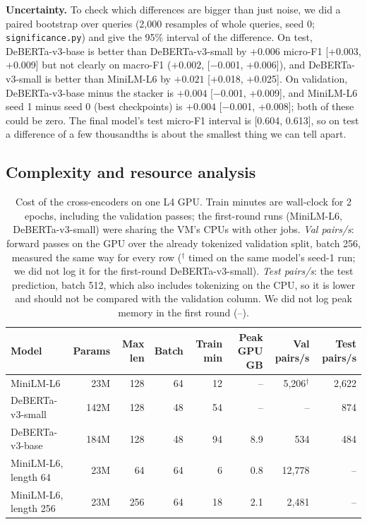 \documentclass[11pt]{article}
\begin{document}
\textbf{Uncertainty.} To check which differences are bigger than just noise, we did a paired bootstrap over queries (2{,}000 resamples of whole queries, seed 0; \texttt{significance.py}) and give the 95\% interval of the difference. On test, DeBERTa-v3-base is better than DeBERTa-v3-small by $+0.006$ micro-F1 [+0.003, +0.009] but not clearly on macro-F1 ($+0.002$, [$-$0.001, +0.006]), and DeBERTa-v3-small is better than MiniLM-L6 by $+0.021$ [+0.018, +0.025]. On validation, DeBERTa-v3-base minus the stacker is $+0.004$ [$-$0.001, +0.009], and MiniLM-L6 seed 1 minus seed 0 (best checkpoints) is $+0.004$ [$-$0.001, +0.008]; both of these could be zero. The final model's test micro-F1 interval is [0.604, 0.613], so on test a difference of a few thousandths is about the smallest thing we can tell apart.

\subsection{Complexity and resource analysis}
\begin{table}[H]\centering\small
\begin{tabular}{lrrrrrrr}\toprule
Model & Params & Max len & Batch & Train min & Peak GPU GB & Val pairs/s & Test pairs/s \\\midrule
MiniLM-L6 & 23M & 128 & 64 & 12 & -- & 5{,}206$^\dagger$ & 2{,}622 \\
DeBERTa-v3-small & 142M & 128 & 48 & 54 & -- & -- & 874 \\
DeBERTa-v3-base & 184M & 128 & 48 & 94 & 8.9 & 534 & 484 \\
MiniLM-L6, length 64 & 23M & 64 & 64 & 6 & 0.8 & 12{,}778 & -- \\
MiniLM-L6, length 256 & 23M & 256 & 64 & 18 & 2.1 & 2{,}481 & -- \\
\bottomrule\end{tabular}
\caption{Cost of the cross-encoders on one L4 GPU. Train minutes are wall-clock for 2 epochs, including the validation passes; the first-round runs (MiniLM-L6, DeBERTa-v3-small) were sharing the VM's CPUs with other jobs. \emph{Val pairs/s}: forward passes on the GPU over the already tokenized validation split, batch 256, measured the same way for every row ($^\dagger$ timed on the same model's seed-1 run; we did not log it for the first-round DeBERTa-v3-small). \emph{Test pairs/s}: the test prediction, batch 512, which also includes tokenizing on the CPU, so it is lower and should not be compared with the validation column. We did not log peak memory in the first round (--).}\label{tab:res}
\end{table}
\end{document}
